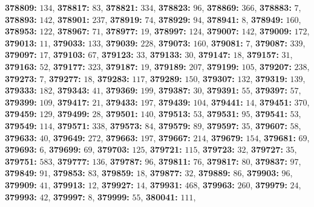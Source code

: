 \textsf{\bfseries 378809:} $134$, \textsf{\bfseries 378817:} $83$, \textsf{\bfseries 378821:} $334$, \textsf{\bfseries 378823:} $96$, \textsf{\bfseries 378869:} $366$, \textsf{\bfseries 378883:} $7$, \textsf{\bfseries 378893:} $142$, \textsf{\bfseries 378901:} $237$, \textsf{\bfseries 378919:} $74$, \textsf{\bfseries 378929:} $94$, \textsf{\bfseries 378941:} $8$, \textsf{\bfseries 378949:} $160$, \textsf{\bfseries 378953:} $122$, \textsf{\bfseries 378967:} $71$, \textsf{\bfseries 378977:} $19$, \textsf{\bfseries 378997:} $124$, \textsf{\bfseries 379007:} $142$, \textsf{\bfseries 379009:} $172$, \textsf{\bfseries 379013:} $11$, \textsf{\bfseries 379033:} $133$, \textsf{\bfseries 379039:} $228$, \textsf{\bfseries 379073:} $160$, \textsf{\bfseries 379081:} $7$, \textsf{\bfseries 379087:} $339$, \textsf{\bfseries 379097:} $17$, \textsf{\bfseries 379103:} $67$, \textsf{\bfseries 379123:} $33$, \textsf{\bfseries 379133:} $30$, \textsf{\bfseries 379147:} $18$, \textsf{\bfseries 379157:} $31$, \textsf{\bfseries 379163:} $52$, \textsf{\bfseries 379177:} $323$, \textsf{\bfseries 379187:} $19$, \textsf{\bfseries 379189:} $207$, \textsf{\bfseries 379199:} $105$, \textsf{\bfseries 379207:} $238$, \textsf{\bfseries 379273:} $7$, \textsf{\bfseries 379277:} $18$, \textsf{\bfseries 379283:} $117$, \textsf{\bfseries 379289:} $150$, \textsf{\bfseries 379307:} $132$, \textsf{\bfseries 379319:} $139$, \textsf{\bfseries 379333:} $182$, \textsf{\bfseries 379343:} $41$, \textsf{\bfseries 379369:} $199$, \textsf{\bfseries 379387:} $30$, \textsf{\bfseries 379391:} $55$, \textsf{\bfseries 379397:} $57$, \textsf{\bfseries 379399:} $109$, \textsf{\bfseries 379417:} $21$, \textsf{\bfseries 379433:} $197$, \textsf{\bfseries 379439:} $104$, \textsf{\bfseries 379441:} $14$, \textsf{\bfseries 379451:} $370$, \textsf{\bfseries 379459:} $129$, \textsf{\bfseries 379499:} $28$, \textsf{\bfseries 379501:} $140$, \textsf{\bfseries 379513:} $53$, \textsf{\bfseries 379531:} $95$, \textsf{\bfseries 379541:} $53$, \textsf{\bfseries 379549:} $114$, \textsf{\bfseries 379571:} $338$, \textsf{\bfseries 379573:} $84$, \textsf{\bfseries 379579:} $89$, \textsf{\bfseries 379597:} $35$, \textsf{\bfseries 379607:} $58$, \textsf{\bfseries 379633:} $40$, \textsf{\bfseries 379649:} $272$, \textsf{\bfseries 379663:} $197$, \textsf{\bfseries 379667:} $214$, \textsf{\bfseries 379679:} $154$, \textsf{\bfseries 379681:} $69$, \textsf{\bfseries 379693:} $6$, \textsf{\bfseries 379699:} $69$, \textsf{\bfseries 379703:} $125$, \textsf{\bfseries 379721:} $115$, \textsf{\bfseries 379723:} $32$, \textsf{\bfseries 379727:} $35$, \textsf{\bfseries 379751:} $583$, \textsf{\bfseries 379777:} $136$, \textsf{\bfseries 379787:} $96$, \textsf{\bfseries 379811:} $76$, \textsf{\bfseries 379817:} $80$, \textsf{\bfseries 379837:} $97$, \textsf{\bfseries 379849:} $91$, \textsf{\bfseries 379853:} $83$, \textsf{\bfseries 379859:} $18$, \textsf{\bfseries 379877:} $32$, \textsf{\bfseries 379889:} $86$, \textsf{\bfseries 379903:} $96$, \textsf{\bfseries 379909:} $41$, \textsf{\bfseries 379913:} $12$, \textsf{\bfseries 379927:} $14$, \textsf{\bfseries 379931:} $468$, \textsf{\bfseries 379963:} $260$, \textsf{\bfseries 379979:} $24$, \textsf{\bfseries 379993:} $42$, \textsf{\bfseries 379997:} $8$, \textsf{\bfseries 379999:} $55$, \textsf{\bfseries 380041:} $111$, 
